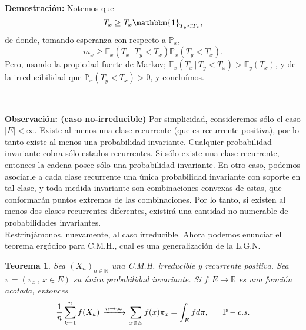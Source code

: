 \documentclass[a4paper]{article}
\newcommand{\prob}{\mathbb{P}}
\newtheorem{teorema}{Teorema}
\numberwithin{equation}{subsection}
\numberwithin{definicion}{subsection}
\def\R{\mathbb R}
\def\N{\mathbb N}
\def\E{\mathbb E}
\begin{document}
\textbf{Demostración: }Notemos que
\[T_x \geq T_x\mathbbm{1}_{T_y<T_x},\]
de donde, tomando esperanza con respecto a $\prob_x$,
\[m_x \geq \E_x(T_x\,|\,T_y<T_x)\prob_x(T_y<T_x).\]
Pero, usando la propiedad fuerte de Markov; $\E_x(T_x\,|\,T_y<T_x) > \E_y(T_x)$, y de la irreducibilidad que $\prob_x(T_y<T_x) >0$, y concluímos.\\
\rule{0.7em}{0.7em}\\ \newline
\textbf{Observación: (caso no-irreducible)} Por simplicidad, consideremos sólo el caso $|E|<\infty$. Existe al menos una clase recurrente (que es recurrente positiva), por lo tanto existe al menos una probabilidad invariante. Cualquier probabilidad invariante cobra sólo estados recurrentes. Si sólo existe una clase recurrente, entonces la cadena posee sólo una probabilidad invariante. En otro caso, podemos asociarle a cada clase recurrente una única probabilidad invariante  con soporte en tal clase, y toda medida invariante son combinaciones convexas de estas, que conformarán puntos extremos de las combinaciones. Por lo tanto, si existen al menos dos clases recurrentes diferentes, existirá una cantidad no numerable de probabilidades invariantes.\\ \newline
Restrinjámonos, nuevamente, al caso irreducible. Ahora podemos enunciar el teorema ergódico para C.M.H., cual es una generalización de la L.G.N.

\begin{teorema}
Sea $(X_n)_{n\in\N}$ una C.M.H. irreducible y recurrente positiva. Sea $\pi = (\pi_x\,,\,x\in E)$ su única probabilidad invariante. Si $f:E\rightarrow \R$ es una función acotada, entonces
\[\frac{1}{n}\sum_{k=1}^n f(X_k)\, \xrightarrow{n\rightarrow \infty}\,\sum_{x\in E}f(x)\pi_x = \int_E f d\pi,\hspace{0.6cm}\prob-c.s.\]
\end{teorema}
\end{document}
